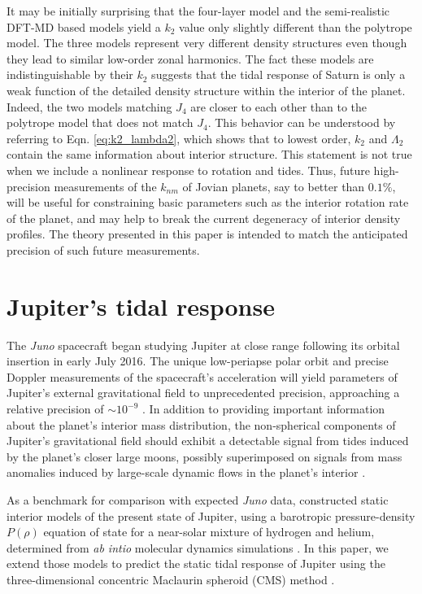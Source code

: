 It may be initially surprising that the four-layer model and the semi-realistic
DFT-MD based models  yield a $k_2$ value only slightly different than the
polytrope model. The three models represent very different density structures
even though they lead to similar low-order zonal harmonics. The fact these
models are indistinguishable by their $k_2$ suggests that the tidal response of
Saturn is only a weak function of the detailed density structure within the
interior of the planet. Indeed, the two models matching $J_4$ are closer to
each other than to the polytrope model that does not match $J_4$. This behavior
can be understood by referring to Eqn.  \eqref{eq:k2_lambda2}, which shows that
to lowest order, $k_2$ and $\Lambda_2$ contain the same information about
interior structure.  This statement is not true when we include a nonlinear
response to rotation and tides.  Thus, future high-precision measurements of
the $k_{nm}$ of Jovian planets, say to better than $0.1\%$, will be useful for
constraining basic parameters such as the interior rotation rate of the planet,
and may help to break the current degeneracy of interior density profiles.  The
theory presented in this paper is intended to match the anticipated precision
of such future measurements.

\section{Jupiter's tidal response} \label{jupiter}

The \textit{Juno} spacecraft began studying Jupiter at close range following its
orbital insertion in early July 2016. The unique low-periapse polar orbit and precise
Doppler measurements of the spacecraft's acceleration will yield parameters of
Jupiter's external gravitational field to unprecedented precision, approaching a
relative precision of $\sim 10^{-9}$ \citep{kaspi2010}. In addition to providing
important information about the planet's interior mass distribution, the
non-spherical components of Jupiter's gravitational field should exhibit a detectable
signal from tides induced by the planet's closer large moons, possibly superimposed
on signals from mass anomalies induced by large-scale dynamic flows in the planet's
interior \citep{cao2015,kaspi2010,kaspi2013}.

As a benchmark for comparison with expected \textit{Juno} data, \citet{hubbard2016}
constructed static interior models of the present state of Jupiter, using a
barotropic pressure-density $P(\rho)$ equation of state for a near-solar mixture of
hydrogen and helium, determined from \textit{ab intio} molecular dynamics simulations
\citep{militzer2013a,militzer2013b}. In this paper, we extend those models to predict
the static tidal response of Jupiter using the three-dimensional concentric Maclaurin
spheroid (CMS) method \citep{wahl2016}.

